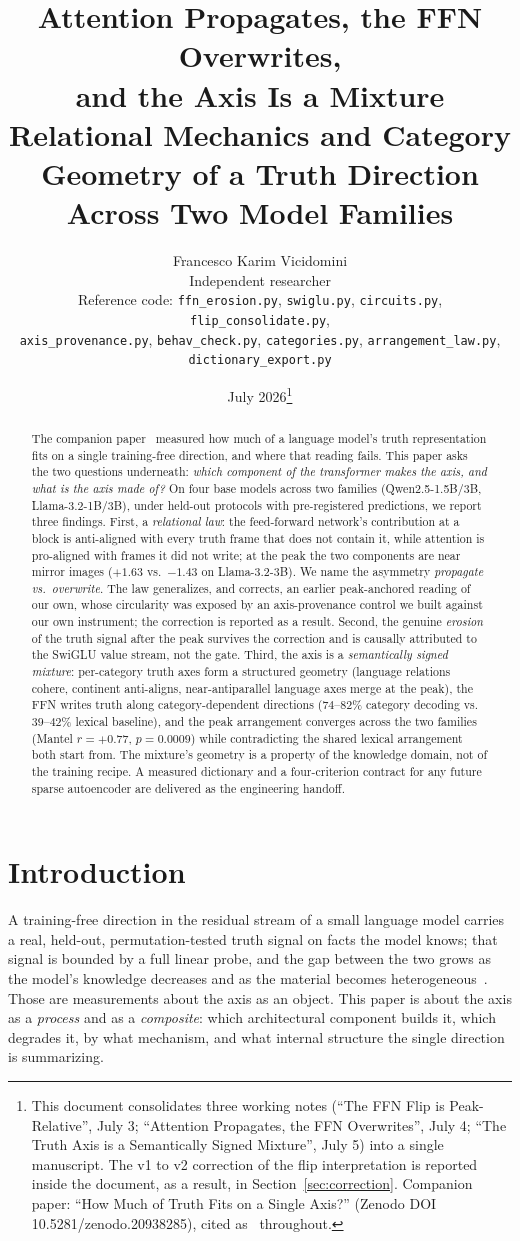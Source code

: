 \documentclass[11pt]{article}
\title{\textbf{Attention Propagates, the FFN Overwrites,\\ and the Axis Is a Mixture}\\[2pt]
\large Relational Mechanics and Category Geometry of a Truth Direction\\
Across Two Model Families}
\author{Francesco Karim Vicidomini\\
\small Independent researcher\\
\small Reference code: \texttt{ffn\_erosion.py}, \texttt{swiglu.py}, \texttt{circuits.py}, \texttt{flip\_consolidate.py},\\
\small \texttt{axis\_provenance.py}, \texttt{behav\_check.py}, \texttt{categories.py}, \texttt{arrangement\_law.py}, \texttt{dictionary\_export.py}}
\date{July 2026\thanks{This document consolidates three working notes (``The FFN
Flip is Peak-Relative'', July 3; ``Attention Propagates, the FFN Overwrites'',
July 4; ``The Truth Axis is a Semantically Signed Mixture'', July 5) into a
single manuscript. The v1 to v2 correction of the flip interpretation is
reported inside the document, as a result, in Section~\ref{sec:correction}.
Companion paper: ``How Much of Truth Fits on a Single Axis?'' (Zenodo DOI
10.5281/zenodo.20938285), cited as~\cite{companion} throughout.}}
\begin{document}
\maketitle

\begin{abstract}
The companion paper~\cite{companion} measured how much of a language model's
truth representation fits on a single training-free direction, and where that
reading fails. This paper asks the two questions underneath: \emph{which
component of the transformer makes the axis, and what is the axis made of?}
On four base models across two families (Qwen2.5-1.5B/3B, Llama-3.2-1B/3B),
under held-out protocols with pre-registered predictions, we report three
findings. First, a \emph{relational law}: the feed-forward network's
contribution at a block is anti-aligned with every truth frame that does not
contain it, while attention is pro-aligned with frames it did not write; at
the peak the two components are near mirror images ($+1.63$ vs.\ $-1.43$ on
Llama-3.2-3B). We name the asymmetry \emph{propagate vs.\ overwrite}. The law
generalizes, and corrects, an earlier peak-anchored reading of our own, whose
circularity was exposed by an axis-provenance control we built against our
own instrument; the correction is reported as a result. Second, the genuine
\emph{erosion} of the truth signal after the peak survives the correction and
is causally attributed to the SwiGLU value stream, not the gate. Third, the
axis is a \emph{semantically signed mixture}: per-category truth axes form a
structured geometry (language relations cohere, continent anti-aligns,
near-antiparallel language axes merge at the peak), the FFN writes truth
along category-dependent directions ($74$--$82\%$ category decoding vs.\
$39$--$42\%$ lexical baseline), and the peak arrangement converges across the
two families (Mantel $r = +0.77$, $p = 0.0009$) while contradicting the
shared lexical arrangement both start from. The mixture's geometry is a
property of the knowledge domain, not of the training recipe. A measured
dictionary and a four-criterion contract for any future sparse autoencoder
are delivered as the engineering handoff.
\end{abstract}

\section{Introduction}

A training-free direction in the residual stream of a small language model
carries a real, held-out, permutation-tested truth signal on facts the model
knows; that signal is bounded by a full linear probe, and the gap between the
two grows as the model's knowledge decreases and as the material becomes
heterogeneous~\cite{companion}. Those are measurements about the axis as an
object. This paper is about the axis as a \emph{process} and as a
\emph{composite}: which architectural component builds it, which degrades it,
by what mechanism, and what internal structure the single direction is
summarizing.
\end{document}
